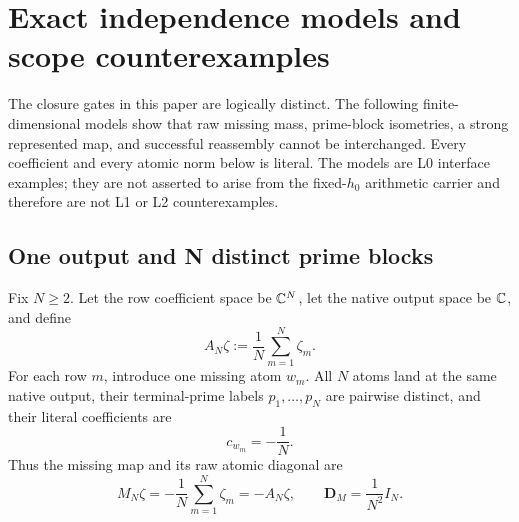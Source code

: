 \section{Exact independence models and scope counterexamples}
\label{sec:tpc62-independence-models}

The closure gates in this paper are logically distinct.  The following
finite-dimensional models show that raw missing mass, prime-block
isometries, a strong represented map, and successful reassembly cannot be
interchanged.  Every coefficient and every atomic norm below is literal.
The models are L0 interface examples; they are not asserted to arise from
the fixed-\(h_0\) arithmetic carrier and therefore are not L1 or L2
counterexamples.

\subsection{One output and N distinct prime blocks}

Fix \(N\ge2\).  Let the row coefficient space be \(\mathbb C^N\), let the native
output space be \(\mathbb C\), and define
\begin{equation}
 A_N\zeta:=\frac1N\sum_{m=1}^N\zeta_m.
 \label{eq:tpc62-one-output-represented-map}
\end{equation}
For each row \(m\), introduce one missing atom \(w_m\).  All \(N\) atoms
land at the same native output, their terminal-prime labels
\(p_1,\ldots,p_N\) are pairwise distinct, and their literal coefficients
are
\begin{equation}
 c_{w_m}=-\frac1N.
 \label{eq:tpc62-one-output-missing-coefficients}
\end{equation}
Thus the missing map and its raw atomic diagonal are
\begin{equation}
 M_N\zeta=-\frac1N\sum_{m=1}^N\zeta_m=-A_N\zeta,
 \qquad
 \mathbf D_M=\frac1{N^2}I_N.
 \label{eq:tpc62-one-output-missing-map}
\end{equation}


